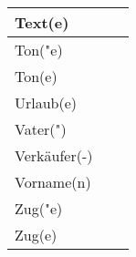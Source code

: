 \documentclass{article}
\begin{document}
\begin{table}[h!]
\begin{tabular}{|>{\raggedright\arraybackslash}p{5cm}|>{\raggedright\arraybackslash}p{5cm}|>{\raggedright\arraybackslash}p{5cm}|}
        Text(e) &  &  \\\hline
        Ton("e) &  &  \\\hline
        Ton(e) &  &  \\\hline
        Urlaub(e) &  &  \\\hline
        Vater(") &  &  \\\hline
        Verkäufer(-) &  &  \\\hline
        Vorname(n) &  &  \\\hline
        Zug("e) &  &  \\\hline
        Zug(e) &  &  \\\hline
    \end{tabular}
\end{table}
\end{document}
